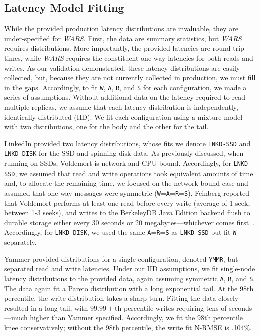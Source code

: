 \documentclass{vldb}
\begin{document}
\subsection{Latency Model Fitting}

While the provided production latency distributions are invaluable,
they are under-specified for \textit{WARS}.  First, the data are
summary statistics, but \textit{WARS} requires distributions.  More
importantly, the provided latencies are round-trip times, while
\textit{WARS} requires the constituent one-way latencies for both
reads and writes.  As our validation demonstrated, these latency
distributions are easily collected, but, because they are not
currently collected in production, we must fill in the
gaps. Accordingly, to fit \texttt{W}, \texttt{A}, \texttt{R}, and
\texttt{S} for each configuration, we made a series of assumptions.
Without additional data on the latency required to read multiple
replicas, we assume that each latency distribution is independently,
identically distributed (IID).  We fit each configuration using a
mixture model with two distributions, one for the body and the other
for the tail.

LinkedIn provided two latency distributions, whose fits we denote
\texttt{LNKD-SSD} and \texttt{LNKD-DISK} for the SSD and spinning disk
data.  As previously discussed, when running on SSDs, Voldemort is
network and CPU bound.  Accordingly, for \texttt{LNKD-SSD}, we assumed
that read and write operations took equivalent amounts of time and, to
allocate the remaining time, we focused on the network-bound case and
assumed that one-way messages were symmetric
(\texttt{W}=\texttt{A}=\texttt{R}=\texttt{S}). Feinberg reported that
Voldemort performs at least one read before every write (average of 1
seek, between 1-3 seeks), and writes to the BerkeleyDB Java Edition
backend flush to durable storage either every 30 seconds or 20
megabytes---whichever comes first~\cite{feinbergpc}.  Accordingly, for
\texttt{LNKD-DISK}, we used the same \texttt{A}=\texttt{R}=\texttt{S}
as \texttt{LNKD-SSD} but fit \texttt{W} separately.

Yammer provided distributions for a single configuration, denoted
\texttt{YMMR}, but separated read and write latencies.  Under our IID
assumptions, we fit single-node latency distributions to the provided
data, again assuming symmetric \texttt{A}, \texttt{R}, and \texttt{S}.
The data again fit a Pareto distribution with a long exponential tail.
At the $98$th percentile, the write distribution takes a sharp turn.
Fitting the data closely resulted in a long tail, with $99.99+$th
percentile writes requiring tens of seconds---much higher than Yammer
specified.  Accordingly, we fit the $98$th percentile knee
conservatively; without the $98$th percentile, the write fit N-RMSE is
.104\%.
\end{document}
